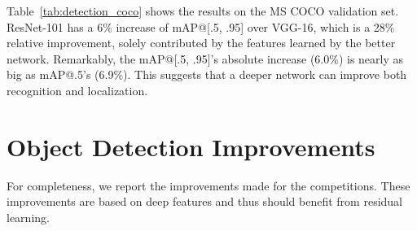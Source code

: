 \documentclass[10pt,twocolumn,letterpaper]{article}
\begin{document}
Table~\ref{tab:detection_coco} shows the results on the MS COCO validation set. ResNet-101 has a 6\% increase of mAP@[.5, .95] over VGG-16, which is a 28\% relative improvement, solely contributed by the features learned by the better network. Remarkably, the mAP@[.5, .95]'s absolute increase (6.0\%) is nearly as big as mAP@.5's (6.9\%). This suggests that a deeper network can improve both recognition and localization.



\section{Object Detection Improvements}

For completeness, we report the improvements made for the competitions. These improvements are based on deep features and thus should benefit from residual learning.
\end{document}
